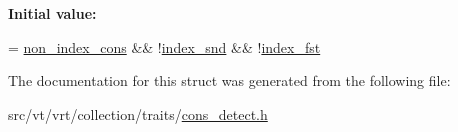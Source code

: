 {\bfseries Initial value\+:}
\begin{DoxyCode}
=
    \hyperlink{structvt_1_1vrt_1_1collection_1_1_constructor_type_a84ceed8f579b40d34fe1cd69d654227d}{non\_index\_cons} && !\hyperlink{structvt_1_1vrt_1_1collection_1_1_constructor_type_a8dc80a798ad30e23016abddd56077be5}{index\_snd} && !\hyperlink{structvt_1_1vrt_1_1collection_1_1_constructor_type_a7ce20228ab2e310eb2e5217652af1741}{index\_fst}
\end{DoxyCode}


The documentation for this struct was generated from the following file\+:\begin{DoxyCompactItemize}
\item 
src/vt/vrt/collection/traits/\hyperlink{cons__detect_8h}{cons\+\_\+detect.\+h}\end{DoxyCompactItemize}
